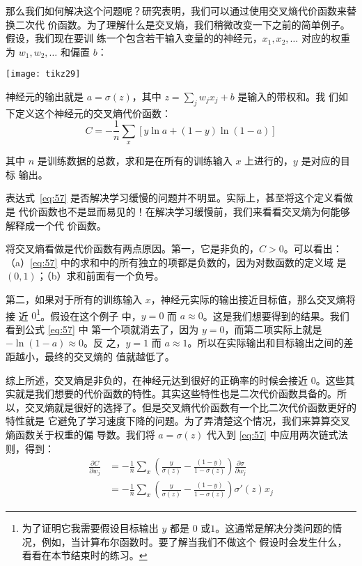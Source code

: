 那么我们如何解决这个问题呢？研究表明，我们可以通过使用交叉熵代价函数来替换二次代
价函数。为了理解什么是交叉熵，我们稍微改变一下之前的简单例子。假设，我们现在要训
练一个包含若干输入变量的的神经元，$x_1, x_2, \ldots$ 对应的权重为 $w_1, w_2,
\ldots$ 和偏置 $b$：

\begin{center}
  \texttt{[image: tikz29]}
\end{center}

神经元的输出就是 $a = \sigma(z)$，其中 $z = \sum_j w_j x_j+b$ 是输入的带权和。我
们如下定义这个神经元的交叉熵代价函数：
\begin{equation}
  C = -\frac{1}{n} \sum_x \left[y \ln a + (1-y ) \ln (1-a) \right]
\label{eq:57}\tag{57}
\end{equation}

其中 $n$ 是训练数据的总数，求和是在所有的训练输入 $x$ 上进行的，$y$ 是对应的目标
输出。

表达式~\eqref{eq:57} 是否解决学习缓慢的问题并不明显。实际上，甚至将这个定义看做是
代价函数也不是显而易见的！在解决学习缓慢前，我们来看看交叉熵为何能够解释成一个代
价函数。

将交叉熵看做是代价函数有两点原因。第一，它是非负的，$C > 0$。可以看出：
（a）\eqref{eq:57} 中的求和中的所有独立的项都是负数的，因为对数函数的定义域
是 $(0,1)$；（b）求和前面有一个负号。

第二，如果对于所有的训练输入 $x$，神经元实际的输出接近目标值，那么交叉熵将接
近 $0$\footnote{为了证明它我需要假设目标输出 $y$ 都是 $0$
  或$1$。这通常是解决分类问题的情况，例如，当计算布尔函数时。要了解当我们不做这个
  假设时会发生什么，看看在本节结束时的练习。}。假设在这个例子
中，$y=0$ 而 $a\approx 0$。这是我们想要得到的结果。我们看到公式 \eqref{eq:57} 中
第一个项就消去了，因为 $y=0$，而第二项实际上就是 $-\ln (1-a)\approx 0$。反
之，$y=1$ 而 $a\approx 1$。所以在实际输出和目标输出之间的差距越小，最终的交叉熵的
值就越低了。

综上所述，交叉熵是非负的，在神经元达到很好的正确率的时候会接近
$0$。这些其实就是我们想要的代价函数的特性。其实这些特性也是二次代价函数具备的。所
以，交叉熵就是很好的选择了。但是交叉熵代价函数有一个比二次代价函数更好的特性就是
它避免了学习速度下降的问题。为了弄清楚这个情况，我们来算算交叉熵函数关于权重的偏
导数。我们将 $a=\sigma(z)$ 代入到 \eqref{eq:57} 中应用两次链式法则，得到：
\begin{align}
  \frac{\partial C}{\partial w_j} &= -\frac{1}{n} \sum_x \left(
  \frac{y }{\sigma(z)} -\frac{(1-y)}{1-\sigma(z)} \right)
  \frac{\partial \sigma}{\partial w_j} \label{eq:58}\tag{58}\\
  &= -\frac{1}{n} \sum_x \left(
  \frac{y}{\sigma(z)}
  -\frac{(1-y)}{1-\sigma(z)} \right)\sigma'(z) x_j \label{eq:59}\tag{59}
\end{align}

